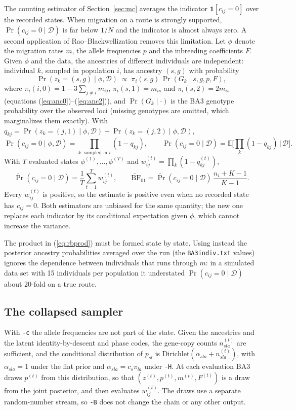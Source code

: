 \documentclass[11pt,a4paper]{article}
\newcommand{\E}{\mathbb{E}}
\newcommand{\BF}{\mathrm{BF}}
\newcommand{\data}{\mathcal{D}}
\newcommand{\1}{\mathbf{1}}
\begin{document}
The counting estimator of Section~\ref{sec:mc} averages the indicator
$\1[c_{ij}=0]$ over the recorded states. When migration on a route is strongly
supported, $\Pr(c_{ij}=0\mid\data)$ is far below $1/N$ and the indicator is
almost always zero. A second application of Rao--Blackwellization removes this
limitation. Let $\phi$ denote the migration rates $m$, the allele frequencies
$p$ and the inbreeding coefficients $F$. Given $\phi$ and the data, the
ancestries of different individuals are independent: individual $k$, sampled
in population $i$, has ancestry $(s,g)$ with probability
\[
\Pr(z_k=(s,g)\mid\phi,\data) \;\propto\; \pi_i(s,g)\,\Pr(G_k\mid s,g,p,F),
\]
where $\pi_i(i,0)=1-3\sum_{j\neq i}m_{ij}$, $\pi_i(s,1)=m_{is}$ and
$\pi_i(s,2)=2m_{is}$ (equations (\ref{eq:anc0})--(\ref{eq:anc2})), and
$\Pr(G_k\mid\cdot)$ is the BA3 genotype probability over the observed loci
(missing genotypes are omitted, which marginalizes them exactly). With
$q_{kj} = \Pr(z_k=(j,1)\mid\phi,\data)+\Pr(z_k=(j,2)\mid\phi,\data)$,
\begin{equation}
\Pr(c_{ij}=0\mid\phi,\data) = \prod_{k:\,\text{sampled in } i} (1-q_{kj}),
\qquad
\Pr(c_{ij}=0\mid\data) = \E\Big[\prod_k (1-q_{kj})\,\Big|\,\data\Big].
\label{eq:rbprod}
\end{equation}
With $T$ evaluated states $\phi^{(1)},\ldots,\phi^{(T)}$ and
$w^{(t)}_{ij} = \prod_k (1-q^{(t)}_{kj})$,
\[
\widetilde{\Pr}(c_{ij}=0\mid\data) = \frac1T\sum_{t=1}^T w^{(t)}_{ij},
\qquad
\widetilde{\BF}_{01} = \widetilde{\Pr}(c_{ij}=0\mid\data)\,\frac{n_i+K-1}{K-1}.
\]
Every $w^{(t)}_{ij}$ is positive, so the estimate is positive even when no
recorded state has $c_{ij}=0$. Both estimators are unbiased for the same
quantity; the new one replaces each indicator by its conditional expectation
given $\phi$, which cannot increase the variance.

The product in (\ref{eq:rbprod}) must be formed state by state. Using instead the
posterior ancestry probabilities averaged over the run (the
\texttt{BA3indiv.txt} values) ignores the dependence between individuals that
runs through $m$: in a simulated data set with 15 individuals per population it
understated $\Pr(c_{ij}=0\mid\data)$ about 20-fold on a true route.

\subsection{The collapsed sampler}

With \texttt{-c} the allele frequencies are not part of the state. Given the
ancestries and the latent identity-by-descent and phase codes, the gene-copy
counts $n^{(t)}_{sla}$ are sufficient, and the conditional distribution of
$p_{sl}$ is $\mathrm{Dirichlet}(\alpha_{sla}+n^{(t)}_{sla})$, with
$\alpha_{sla}=1$ under the flat prior and $\alpha_{sla}=c_s\pi_{la}$ under
\texttt{-H}. At each evaluation BA3 draws $p^{(t)}$ from this distribution, so
that $(z^{(t)},p^{(t)},m^{(t)},F^{(t)})$ is a draw from the joint posterior, and
then evaluates $w^{(t)}_{ij}$. The draws use a separate random-number stream, so
\texttt{-B} does not change the chain or any other output.
\end{document}
